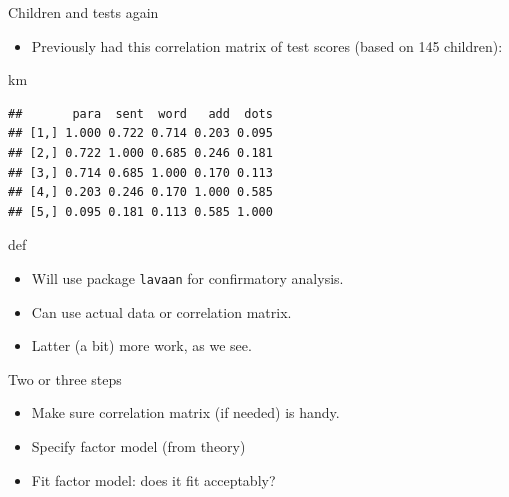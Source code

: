 \documentclass[ignorenonframetext,]{beamer}
\newenvironment{Shaded}{\begin{snugshade}}{\end{snugshade}}
\newcommand{\NormalTok}[1]{#1}
\providecommand{\tightlist}{%
  \setlength{\itemsep}{0pt}\setlength{\parskip}{0pt}}
\begin{document}
\begin{frame}[fragile]{Children and tests again}
\protect\hypertarget{children-and-tests-again}{}

\begin{itemize}
\tightlist
\item
  Previously had this correlation matrix of test scores (based on 145
  children):
\end{itemize}

\begin{Shaded}
\begin{Highlighting}[]
\NormalTok{km}
\end{Highlighting}
\end{Shaded}

\begin{verbatim}
##       para  sent  word   add  dots
## [1,] 1.000 0.722 0.714 0.203 0.095
## [2,] 0.722 1.000 0.685 0.246 0.181
## [3,] 0.714 0.685 1.000 0.170 0.113
## [4,] 0.203 0.246 0.170 1.000 0.585
## [5,] 0.095 0.181 0.113 0.585 1.000
\end{verbatim}

def

\begin{itemize}
\item
  Will use package \texttt{lavaan} for confirmatory analysis.
\item
  Can use actual data or correlation matrix.
\item
  Latter (a bit) more work, as we see.
\end{itemize}

\end{frame}

\begin{frame}{Two or three steps}
\protect\hypertarget{two-or-three-steps}{}

\begin{itemize}
\item
  Make sure correlation matrix (if needed) is handy.
\item
  Specify factor model (from theory)
\item
  Fit factor model: does it fit acceptably?
\end{itemize}

\end{frame}
\end{document}
